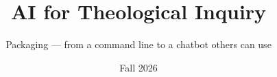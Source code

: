 


\title{AI for Theological Inquiry}
\subtitle{Packaging --- from a command line to a chatbot others can use}
\date{Fall 2026}





